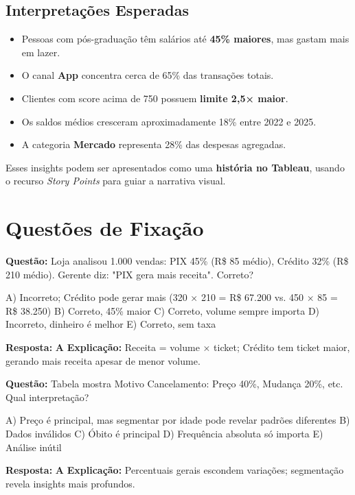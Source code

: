 \begin{appendices}
\subsection*{Interpretações Esperadas}
\begin{itemize}
  \item Pessoas com pós-graduação têm salários até \textbf{45\% maiores}, mas gastam mais em lazer.
  \item O canal \textbf{App} concentra cerca de 65\% das transações totais.
  \item Clientes com score acima de 750 possuem \textbf{limite 2,5× maior}.
  \item Os saldos médios cresceram aproximadamente 18\% entre 2022 e 2025.
  \item A categoria \textbf{Mercado} representa 28\% das despesas agregadas.
\end{itemize}

Esses insights podem ser apresentados como uma \textbf{história no Tableau}, usando o recurso \textit{Story Points} para guiar a narrativa visual.

\end{appendices}

\section*{Questões de Fixação}

\begin{SolvedBox}[title=Questão de Fixação 1 - Variáveis Categóricas]
\textbf{Questão:} Loja analisou 1.000 vendas: PIX 45\% (R\$ 85 médio), Crédito 32\% (R\$ 210 médio). Gerente diz: "PIX gera mais receita". Correto?

A) Incorreto; Crédito pode gerar mais (320 × 210 = R\$ 67.200 vs. 450 × 85 = R\$ 38.250)  
B) Correto, 45\% maior  
C) Correto, volume sempre importa  
D) Incorreto, dinheiro é melhor  
E) Correto, sem taxa

\textbf{Resposta:} \textbf{A}  
\textbf{Explicação:} Receita = volume × ticket; Crédito tem ticket maior, gerando mais receita apesar de menor volume.
\end{SolvedBox}

\begin{SolvedBox}[title=Questão de Fixação 2 - Frequência e Proporções]
\textbf{Questão:} Tabela mostra Motivo Cancelamento: Preço 40\%, Mudança 20\%, etc. Qual interpretação?

A) Preço é principal, mas segmentar por idade pode revelar padrões diferentes  
B) Dados inválidos  
C) Óbito é principal  
D) Frequência absoluta só importa  
E) Análise inútil

\textbf{Resposta:} \textbf{A}  
\textbf{Explicação:} Percentuais gerais escondem variações; segmentação revela insights mais profundos.
\end{SolvedBox}
